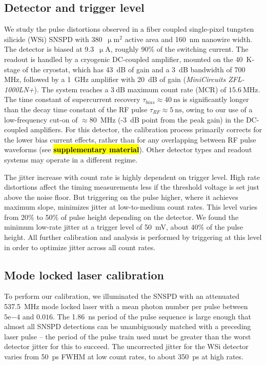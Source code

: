 \documentclass[11pt]{caltech_thesis} %
\begin{document}
\hypertarget{detector-and-trigger-level}{%
\subsection{Detector and trigger level}\label{detector-and-trigger-level}}

We study the pulse distortions observed in a fiber coupled single-pixel tungsten silicide (WSi) SNSPD with 380~$\mathrm{\upmu m^2}$ active area and 160~nm nanowire width. The detector is biased at 9.3~$\mathrm{\upmu A}$, roughly 90\% of the switching current. The readout is handled by a cryogenic DC-coupled amplifier, mounted on the 40~K-stage of the cryostat, which has 43~dB of gain and a 3~dB bandwidth of 700 MHz, followed by a 1~GHz amplifier with 20~dB of gain (\emph{MiniCircuits ZFL-1000LN+}). The system reaches a $3~\mathrm{dB}$ maximum count rate (MCR) of $15.6~\mathrm{MHz}$. The time constant of supercurrent recovery $\tau_{bias} \approx 40~\mathrm{ns}$ is significantly longer than the decay time constant of the RF pulse $\tau_{RF} \approx 5~\mathrm{ns}$, owing to our use of a low-frequency cut-on of $\approx 80$~MHz (-3~dB point from the peak gain) in the DC-coupled amplifiers. For this detector, the calibration process primarily corrects for the lower bias current effects, rather than for any overlapping between RF pulse waveforms (see \textbf{\hl{supplementary material}}). Other detector types and readout systems may operate in a different regime.

The jitter increase with count rate is highly dependent on trigger level. High rate distortions affect the timing measurements less if the threshold voltage is set just above the noise floor.
But triggering on the pulse higher, where it achieves maximum slope, minimizes jitter at low-to-medium count rates. This level varies from 20\% to 50\% of pulse height depending on the detector. We found the minimum low-rate jitter at a trigger level of 50~mV, about 40\% of the pulse height. All further calibration and analysis is performed by triggering at this level in order to optimize jitter across all count rates.

\hypertarget{mode-locked-laser-calibration}{%
\subsection{Mode locked laser calibration}\label{mode-locked-laser-calibration}}

To perform our calibration, we illuminated the SNSPD with an attenuated 537.5~MHz mode locked laser with a mean photon number per pulse between $5\mathrm{e}{-4}$ and $0.016$. The 1.86~ns period of the pulse sequence is large enough that almost all SNSPD detections can be unambiguously matched with a preceding laser pulse -- the period of the pulse train used must be greater than the worst detector jitter for this to succeed. The uncorrected jitter for the WSi detector varies from 50~ps FWHM at low count rates, to about 350~ps at high rates.
\end{document}

